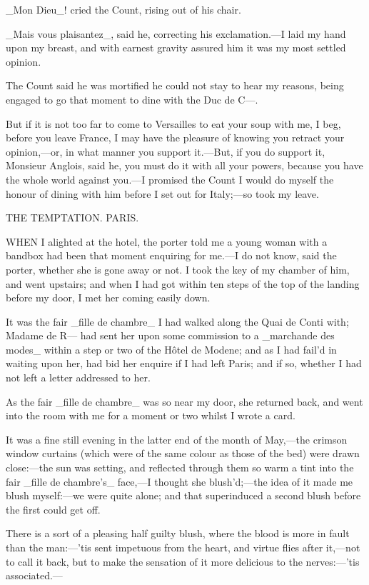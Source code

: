 \documentclass[twoside]{article}
\begin{document}
_Mon Dieu_! cried the Count, rising out of his chair.

_Mais vous plaisantez_, said he, correcting his exclamation.—I laid my
hand upon my breast, and with earnest gravity assured him it was my most
settled opinion.

The Count said he was mortified he could not stay to hear my reasons,
being engaged to go that moment to dine with the Duc de C—.

But if it is not too far to come to Versailles to eat your soup with me,
I beg, before you leave France, I may have the pleasure of knowing you
retract your opinion,—or, in what manner you support it.—But, if you do
support it, Monsieur Anglois, said he, you must do it with all your
powers, because you have the whole world against you.—I promised the
Count I would do myself the honour of dining with him before I set out
for Italy;—so took my leave.




THE TEMPTATION.
PARIS.


WHEN I alighted at the hotel, the porter told me a young woman with a
bandbox had been that moment enquiring for me.—I do not know, said the
porter, whether she is gone away or not.  I took the key of my chamber of
him, and went upstairs; and when I had got within ten steps of the top of
the landing before my door, I met her coming easily down.

It was the fair _fille de chambre_ I had walked along the Quai de Conti
with; Madame de R— had sent her upon some commission to a _marchande des
modes_ within a step or two of the Hôtel de Modene; and as I had fail’d
in waiting upon her, had bid her enquire if I had left Paris; and if so,
whether I had not left a letter addressed to her.

As the fair _fille de chambre_ was so near my door, she returned back,
and went into the room with me for a moment or two whilst I wrote a card.

It was a fine still evening in the latter end of the month of May,—the
crimson window curtains (which were of the same colour as those of the
bed) were drawn close:—the sun was setting, and reflected through them so
warm a tint into the fair _fille de chambre’s_ face,—I thought she
blush’d;—the idea of it made me blush myself:—we were quite alone; and
that superinduced a second blush before the first could get off.

There is a sort of a pleasing half guilty blush, where the blood is more
in fault than the man:—’tis sent impetuous from the heart, and virtue
flies after it,—not to call it back, but to make the sensation of it more
delicious to the nerves:—’tis associated.—
\end{document}
